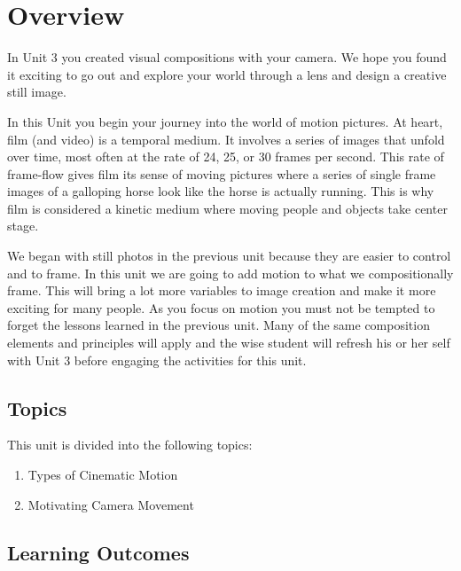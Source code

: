 \documentclass[
  letterpaper,
  DIV=11,
  numbers=noendperiod]{scrreprt}
\providecommand{\tightlist}{%
  \setlength{\itemsep}{0pt}\setlength{\parskip}{0pt}}\usepackage{longtable,booktabs,array}
\begin{document}
\section*{Overview}\label{overview-3}


In Unit 3 you created visual compositions with your camera. We hope you
found it exciting to go out and explore your world through a lens and
design a creative still image.

In this Unit you begin your journey into the world of motion pictures.
At heart, film (and video) is a temporal medium. It involves a series of
images that unfold over time, most often at the rate of 24, 25, or 30
frames per second. This rate of frame-flow gives film its sense of
moving pictures where a series of single frame images of a galloping
horse look like the horse is actually running. This is why film is
considered a kinetic medium where moving people and objects take center
stage.

We began with still photos in the previous unit because they are easier
to control and to frame. In this unit we are going to add motion to what
we compositionally frame. This will bring a lot more variables to image
creation and make it more exciting for many people. As you focus on
motion you must not be tempted to forget the lessons learned in the
previous unit. Many of the same composition elements and principles will
apply and the wise student will refresh his or her self with Unit 3
before engaging the activities for this unit.

\subsection*{Topics}\label{topics-3}

This unit is divided into the following topics:

\begin{enumerate}
\def\labelenumi{\arabic{enumi}.}
\tightlist
\item
  Types of Cinematic Motion
\item
  Motivating Camera Movement
\end{enumerate}

\subsection*{Learning Outcomes}\label{learning-outcomes-3}
\end{document}
